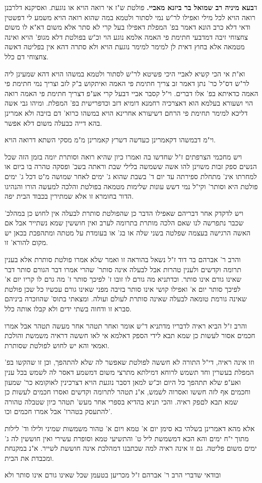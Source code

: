 \documentclass[12pt, openany]{book}
\begin{document}
{ ד\textbf{בעא מיניה רב שמואל בר ביזנא מאביי.}  פולטת ש"ז אי רואה הויא או נוגעת. ואסיקנא דלרבנן רואה הויא לכל מילי ואפילו לר"ש נמי לסתור ולטמא במה שהוא רואה הויא משמע לי דפשטין ודאי דלא כרב הונא דאמר בפ' המפלת דאפילו בעל קרי לא סתר אלא משום דא"א לו משום צחצוחי זיבה דמדבעי חתימת פי האמה אלמא נוגע הוי וכ"ש בפולטת דלא מגופ' הויא ואינה מטמאה אלא בחוץ דאית לן למימר למימר נוגעת הויא ולא סתרה דהא אין בפליטה דאשה צחצוחי דם כלל.\par  וא"ת אי הכי קשיא לאביי היכי פשיטא לר"ש לסתור ולטמא במשהו הויא דהא שמעינן ליה לר"ש דס"ל כר' נתן דאמר זב צריך חתימת פי האמה ואיתקוש ב"ק לזב וצריך נמי חתימת פי האמה כדאיתא בפ' אלו דברים. וי"ל קסבר אביי דבעל קרי אע"פ דצריך חתימת פי האמה רואה הוי ושעורא בעלמא הוא דאצרכיה רחמנא דומיא דזב וכדפרישית בפ' המפלת. ומיהו גבי אשה דליכא למימר תחימת פי הרחם דשיעורא אחרינא הויא במשהו כרוא' דם בזיבה ולא אמרינן בהא דייה כבעלה משום דלא אפשר.\par  וי"מ דבמשהו דקאמרינן כעדשה דשרץ קאמרינן מ"מ מסקי השתא דרואה הויא.\par ויש מחכמי הצרפתים ז"ל שחדשו בה ואמרו כיון שהיא רואה וסותרת יומה בזמן הזה שכל הנשים ספק זבות משוינן להו אשה ששמשה בלילי שבת וראתה בשב' ופסקה טהרה בו ביום או למחרתו אינ' מתחלת ספירתה עד יום ד' בשבת שהוא ג' ימים לאחר שמושה מ"ט דכל ג' ימים פולטת היא וסותר' וקי"ל נמי דשש עונות שלימות מטמאה בפולטת והלכה למעשה הורו והנהיגו הדור בחומרא זו אלא שמתירין בכבוד הבית יפה.\par ויש לדקדק אחר דבריהם שאפילו הדבר כן שהפולטת סותרת לבעלה אין לחוש כן במהלכ' שכבר נתפרשה לנו שאם הלכה מותרת בתרומה לערב ואין חוששין שמא נשתייר אבל אם האשה הרגישה בעצמה שפלטה בשני שלה או בג' או בעומדת על מטתה ומתהפכת בכאן יש מקום להורא' זו.\par  והרב ר' אברהם בר דוד ז"ל נשאל בהוראה זו ואמר שלא אמרו פולטת סותרת אלא בענין תרומה וקדשים ולענין טהרות אבל לבעלה אינה סותר' שהרי אמרו דבר הגורם סותר דבר שאינו גורם אינו סותר. וכדתניא מה גורם לו זובו ז' לפיכך סותר ז' מה גרם לו קריו יום א' לפיכך סותר יום א' ואפילו קושי אינו סותר בזיבה מפני שאינו גורם עכשיו כל שכן פולטת שאינה גורמת טומאה לבעלה שאינה סותרת לעולם ועולה. ומצאתי בתוס' שהוזכרה ביניהם סברא זו ודחוה בשתי ידים ולא קבלו אותה כלל.\par  והרב ז"ל הביא ראיה לדבריו מדתניא ד"ש אומר ואחר תטהר אחר מעשה תטהר אבל אמרו חכמים אסור לעשות כן שמא תבא לידי הספק דאלמא אי לאו חששה דראיה משמשת והולכת ואמאי והא יש לחוש לפולטת שסותרת.\par  וזו אינה ראיה, די"ל התורה לא חששה לפולטת שאפשר לה שלא להתהפך, וכן זו שהקשו בפ' המפלת בעשרין וחד תשמש לרוחא דמילתא מתרצי משום דמשמע דאסר לה לשמש בכל ענין ואע"פ שלא תתהפך כל היום וכ"ש למאן דסבר נוגעת הויא דצרכינין לאוקומא כר' שמעון וחכמים אף לזה חששו ואסרוה לשמש, א"נ תטהר לתרומה וקדשים ואסרו חכמים לעשות כן שמא תבא לםפק ראיה. והכי תניא בהדיא בספרי אחר מעש' תטהר כיון שטבלה טהורה להתעסק בטהרו' אבל אמרו חכמים וכו'.\par אלא מהא דאמרינן בשלהי בא סימן יום א' טמא ויום א' טהור משמשות שמיני ולילו וד' לילות מתוך י"ח ימים והא הכא דמשמשת ליל ט' והתשיעי טמא וסופרת עשירי ואין חוששין לה ג' ימים משום פליטה. גם זו אינה ראיה למה שכתבנו דמהלכת אינה חוששת לשייר. א"נ במקנחת ומכבדת את הבית.\par  ובודאי שדברי הרב ר' אברהם ז"ל מכריען בטעמן שכל שאינו גורם אינו סותר ולא }
\end{document}
